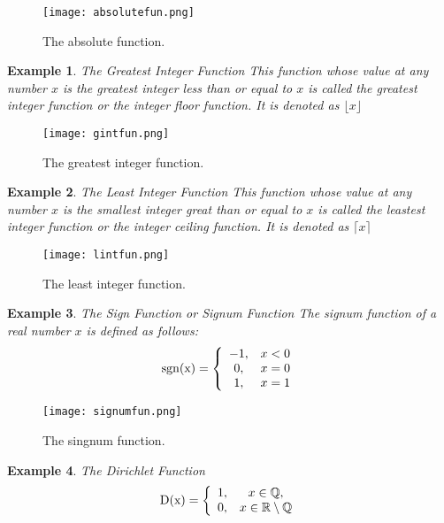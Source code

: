\documentclass[a4paper,12pt]{article} %
\newtheorem{example}{Example}[section]
\begin{document}
\begin{figure}[h!]
    \centering
    \texttt{[image: absolutefun.png]}
    \caption{The absolute function.}
    \label{fig:absolutefun}
\end{figure}

\begin{example}{The Greatest Integer Function}
    This function whose value at any number $x$ is the greatest 
    integer less than or equal to $x$ is called the greatest 
    integer function or the integer floor function. It is 
    denoted as $\lfloor x \rfloor$
\end{example}
\begin{figure}[h!]
    \centering
    \texttt{[image: gintfun.png]}
    \caption{The greatest integer function.}
    \label{fig:gintfun}
\end{figure}

\begin{example}{The Least Integer Function}
    This function whose value at any number $x$ is the smallest 
    integer great than or equal to $x$ is called the leastest 
    integer function or the integer ceiling function. It is 
    denoted as $\lceil x \rceil$
\end{example}
\begin{figure}[h!]
    \centering
    \texttt{[image: lintfun.png]}
    \caption{The least integer function.}
    \label{fig:lintfun}
\end{figure}

\begin{example}{The Sign Function or Signum Function}
    The signum function of a real number $x$ is defined as 
    follows:
    \[
        \rm{sgn} (x) = \left\{\begin{array}{cc} 
                   -1,  & x < 0\\
                    0,  & x = 0\\
                    1,  & x = 1
        \end{array}\right.
        \]
\end{example}

\begin{figure}[h!]
    \centering
    \texttt{[image: signumfun.png]}
    \caption{The singnum function.}
    \label{fig:singnum}
\end{figure}

\begin{example}{The Dirichlet Function}
    \[
        \rm D(x) = \left\{\begin{array}{cc} 
            1, & x \in \mathbb{Q},\\
            0, & x \in \mathbb{R} \setminus \mathbb{Q}
        \end{array}\right.
        \]
\end{example}
\end{document}
